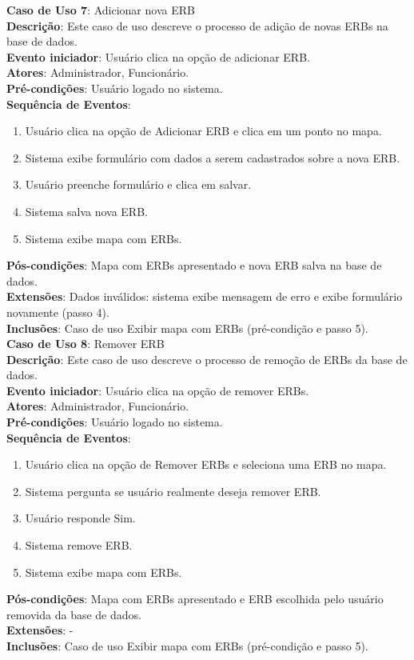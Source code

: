 \documentclass[]{politex}
\begin{document}
\noindent \textbf{Caso de Uso 7}: Adicionar nova ERB \\
\textbf{Descrição}: Este caso de uso descreve o processo de adição de novas
ERBs na base de dados. \\
\textbf{Evento iniciador}: Usuário clica na opção de adicionar ERB. \\
\textbf{Atores}: Administrador, Funcionário. \\
\textbf{Pré-condições}: Usuário logado no sistema. \\
\textbf{Sequência de Eventos}:
\begin{enumerate}
\item Usuário clica na opção de Adicionar ERB e clica em um ponto no mapa.
\item Sistema exibe formulário com dados a serem cadastrados sobre a nova ERB.
\item Usuário preenche formulário e clica em salvar.
\item Sistema salva nova ERB.
\item Sistema exibe mapa com ERBs.
\end{enumerate}
\textbf{Pós-condições}: Mapa com ERBs apresentado e nova ERB salva na base de
dados. \\
\textbf{Extensões}: Dados inválidos: sistema exibe mensagem de erro e exibe 
formulário novamente (passo 4). \\
\textbf{Inclusões}: Caso de uso Exibir mapa com ERBs (pré-condição e passo 5).\\


\noindent \textbf{Caso de Uso 8}: Remover ERB \\
\textbf{Descrição}: Este caso de uso descreve o processo de remoção de ERBs da
base de dados. \\
\textbf{Evento iniciador}: Usuário clica na opção de remover ERBs. \\
\textbf{Atores}: Administrador, Funcionário. \\
\textbf{Pré-condições}: Usuário logado no sistema. \\
\textbf{Sequência de Eventos}:
\begin{enumerate}
\item Usuário clica na opção de Remover ERBs e seleciona uma ERB no mapa.
\item Sistema pergunta se usuário realmente deseja remover ERB.
\item Usuário responde Sim.
\item Sistema remove ERB.
\item Sistema exibe mapa com ERBs.
\end{enumerate}
\textbf{Pós-condições}: Mapa com ERBs apresentado e ERB escolhida pelo usuário
removida da base de dados. \\
\textbf{Extensões}: - \\
\textbf{Inclusões}: Caso de uso Exibir mapa com ERBs (pré-condição e passo 5). \\
\end{document}
